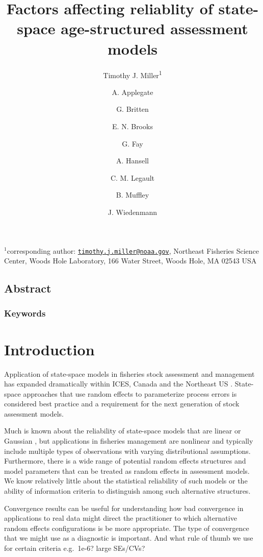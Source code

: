 \documentclass[
  12pt,
]{article}
\title{Factors affecting reliablity of state-space age-structured
assessment models}
\author{Timothy J. Miller\textsuperscript{1} \and A. Applegate \and G.
Britten \and E. N. Brooks \and G. Fay \and A. Hansell \and C. M.
Legault \and B. Muffley \and J. Wiedenmann}
\date{}
\begin{document}
\maketitle

\(^1\)corresponding author:
\href{mailto:timothy.j.miller@noaa.gov}{\nolinkurl{timothy.j.miller@noaa.gov}},
Northeast Fisheries Science Center, Woods Hole Laboratory, 166 Water
Street, Woods Hole, MA 02543 USA\\

\pagebreak

\hypertarget{abstract}{%
\subsection*{Abstract}\label{abstract}}

\hypertarget{keywords}{%
\subsubsection*{Keywords}\label{keywords}}

\pagebreak

\hypertarget{introduction}{%
\section*{Introduction}\label{introduction}}

Application of state-space models in fisheries stock assessment and
management has expanded dramatically within ICES, Canada and the
Northeast US \citep{nielsenberg14,cadigan16,stockmiller21}. State-space
approaches that use random effects to parameterize process errors is
considered best practice and a requirement for the next generation of
stock assessment models.

Much is known about the reliability of state-space models that are
linear or Gaussian \citep{aeberhardetal18}, but applications in
fisheries management are nonlinear and typically include multiple types
of observations with varying distributional assumptions. Furthermore,
there is a wide range of potential random effects structures and model
parameters that can be treated as random effects in assessment models.
We know relatively little about the statistical reliability of such
models or the ability of information criteria to distinguish among such
alternative structures.

Convergence results can be useful for understanding how bad convergence
in applications to real data might direct the practitioner to which
alternative random effects configurations is be more appropriate. The
type of convergence that we might use as a diagnostic is important. And
what rule of thumb we use for certain criteria e.g.~1e-6? large SEs/CVs?
\end{document}
